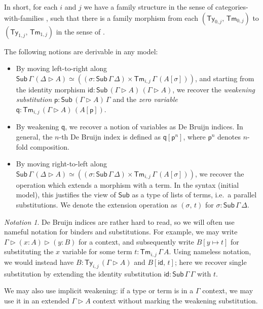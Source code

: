 \documentclass[acmsmall]{acmart}
\newcommand{\msf}[1]{\mathsf{#1}}
\newcommand{\ext}{\triangleright}
\newcommand{\Sub}{\msf{Sub}}
\newcommand{\Ty}{\msf{Ty}}
\newcommand{\Tm}{\msf{Tm}}
\newcommand{\p}{\mathsf{p}}
\newcommand{\q}{\mathsf{q}}
\newcommand{\id}{\msf{id}}
\theoremstyle{remark}
\newtheorem{notation}{Notation}
\begin{document}
In short, for each $i$ and $j$ we have a family structure in the sense of
categories-with-families \cite{TODO}, such that there is a family morphism from
each $(\Ty_{0,j},\,\Tm_{0,j})$ to $(\Ty_{1,j},\,\Tm_{1,j})$ in the sense of
\cite{TODO}.

The following notions are derivable in any model:
\begin{itemize}
\item
  By moving left-to-right along $\Sub\,\Gamma\,(\Delta\ext A) \simeq ((\sigma :
  \Sub\,\Gamma\,\Delta) \times \Tm_{i,j}\,\Gamma\,(A[\sigma]))$,
  and starting from the identity morphism $\id : \Sub\,(\Gamma\ext A)\,(\Gamma\ext A)$, we recover
  the \emph{weakening substitution} $\p : \Sub\,(\Gamma\ext A)\,\Gamma$ and the \emph{zero variable}
  $\q : \Tm_{i,j}\,(\Gamma\ext A)\,(A[\p])$.
\item
  By weakening $\q$, we recover a notion of variables as De Bruijn
  indices. In general, the $n$-th De Bruijn index is defined as $\q[\p^{n}]$,
  where $\p^{n}$ denotes $n$-fold composition.
\item
  By moving right-to-left along $\Sub\,\Gamma\,(\Delta\ext A) \simeq ((\sigma :
  \Sub\,\Gamma\,\Delta) \times \Tm_{i,j}\,\Gamma\,(A[\sigma]))$, we recover the
  operation which extends a morphism with a term. In the syntax (initial model),
  this justifies the view of $\Sub$ as a type of lists of terms, i.e.\ a
  parallel substitutions. We denote the extension operation as $(\sigma,\,t)$
  for $\sigma : \Sub\,\Gamma\,\Delta$.
\end{itemize}

\begin{notation}
De Bruijn indices are rather hard to read, so we will often use nameful notation
for binders and substitutions. For example, we may write $\Gamma \ext (x : A)
\ext (y : B)$ for a context, and subsequently write $B[y \mapsto t]$ for
substituting the $x$ variable for some term $t : \Tm_{i,j}\,\Gamma\,A$. Using
nameless notation, we would instead have $B : \Ty_{i,j}\,(\Gamma \ext A)$ and
$B[\id,\,t]$; here we recover single substitution by extending the identity
substitution $\id : \Sub\,\Gamma\,\Gamma$ with $t$.

We may also use implicit weakening: if a type or term is in a $\Gamma$ context,
we may use it in an extended $\Gamma \ext A$ context without marking the
weakening substitution.
\end{notation}
\end{document}
